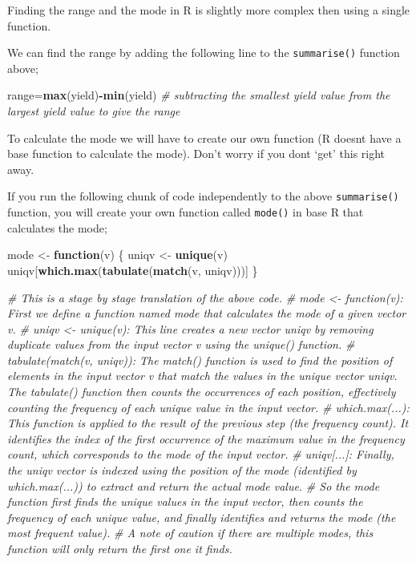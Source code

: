 \documentclass[
]{book}
\newenvironment{Shaded}{\begin{snugshade}}{\end{snugshade}}
\newcommand{\CommentTok}[1]{\textcolor[rgb]{0.56,0.35,0.01}{\textit{#1}}}
\newcommand{\ControlFlowTok}[1]{\textcolor[rgb]{0.13,0.29,0.53}{\textbf{#1}}}
\newcommand{\FunctionTok}[1]{\textcolor[rgb]{0.13,0.29,0.53}{\textbf{#1}}}
\newcommand{\NormalTok}[1]{#1}
\newcommand{\OtherTok}[1]{\textcolor[rgb]{0.56,0.35,0.01}{#1}}
\newcommand{\SpecialCharTok}[1]{\textcolor[rgb]{0.81,0.36,0.00}{\textbf{#1}}}
\begin{document}
Finding the range and the mode in R is slightly more complex then using a single function.

We can find the range by adding the following line to the \texttt{summarise()} function above;

\begin{Shaded}
\begin{Highlighting}[]
\NormalTok{range}\OtherTok{=}\FunctionTok{max}\NormalTok{(yield)}\SpecialCharTok{{-}}\FunctionTok{min}\NormalTok{(yield) }\CommentTok{\# subtracting the smallest yield value from the largest yield value to give the range}
\end{Highlighting}
\end{Shaded}

To calculate the mode we will have to create our own function (R doesnt have a base function to calculate the mode). Don't worry if you dont `get' this right away.

If you run the following chunk of code independently to the above \texttt{summarise()} function, you will create your own function called \texttt{mode()} in base R that calculates the mode;

\begin{Shaded}
\begin{Highlighting}[]
\NormalTok{mode }\OtherTok{\textless{}{-}} \ControlFlowTok{function}\NormalTok{(v) \{}
\NormalTok{  uniqv }\OtherTok{\textless{}{-}} \FunctionTok{unique}\NormalTok{(v)}
\NormalTok{  uniqv[}\FunctionTok{which.max}\NormalTok{(}\FunctionTok{tabulate}\NormalTok{(}\FunctionTok{match}\NormalTok{(v, uniqv)))]}
\NormalTok{\}}

\CommentTok{\# This is a stage by stage translation of the above code.}
\CommentTok{\# mode \textless{}{-} function(v): First we define a function named mode that calculates the mode of a given vector v.}
\CommentTok{\# uniqv \textless{}{-} unique(v): This line creates a new vector uniqv by removing duplicate values from the input vector v using the unique() function.}
\CommentTok{\# tabulate(match(v, uniqv)): The match() function is used to find the position of elements in the input vector v that match the values in the unique vector uniqv. The tabulate() function then counts the occurrences of each position, effectively counting the frequency of each unique value in the input vector.}
\CommentTok{\# which.max(...): This function is applied to the result of the previous step (the frequency count). It identifies the index of the first occurrence of the maximum value in the frequency count, which corresponds to the mode of the input vector.}
\CommentTok{\# uniqv[...]: Finally, the uniqv vector is indexed using the position of the mode (identified by which.max(...)) to extract and return the actual mode value.}
\CommentTok{\# So the mode function first finds the unique values in the input vector, then counts the frequency of each unique value, and finally identifies and returns the mode (the most frequent value).}
\CommentTok{\# A note of caution if there are multiple modes, this function will only return the first one it finds.}
\end{Highlighting}
\end{Shaded}
\end{document}
